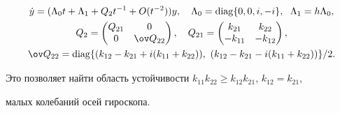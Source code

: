 \begin{gather*} 


\Dot y=(\Lambda_0t+\Lambda_1+Q_2t^{-1}+O(t^{-2}))y,\quad 


\Lambda_0=\diag\{0,0,i,-i\},\ \; \Lambda_1=h\Lambda_0,\\ 


Q_{2}=\begin{pmatrix} 


Q_{21} & 0 \\ 0 & \ov Q_{22} 


\end{pmatrix} 


,\quad 


Q_{21}=\begin{pmatrix} 


k_{21} & k_{22} \\ -k_{11} & -k_{12} 


\end{pmatrix} 


,\\ 


\ov Q_{22}=\diag\{(k_{12}-k_{21}+i(k_{11}+k_{22})), 


\ (k_{12}-k_{21}-i(k_{11}+k_{22}))\}/2. 


\end{gather*} 


Это позволяет найти область устойчивости $k_{11}k_{22}\ge 


k_{12}k_{21}$, $k_{12}=k_{21}$,


малых колебаний осей гироскопа. 


 


